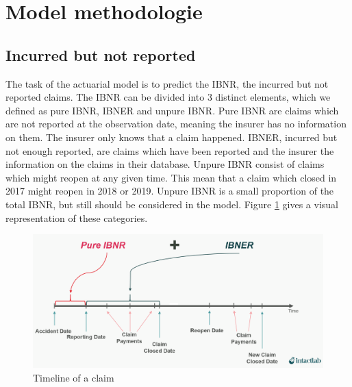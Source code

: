 \section{Model methodologie}\label{Sect_Methodologie}
\subsection{Incurred but not reported}
	The task of the actuarial model is to predict the IBNR, the incurred but not reported claims. The IBNR can be divided into 3 distinct elements, which we defined as pure IBNR, IBNER and unpure IBNR. Pure IBNR are claims which are not reported at the observation date, meaning the insurer has no information on them. The insurer only knows that a claim happened. IBNER, incurred but not enough reported, are claims which have been reported and the insurer the information on the claims in their database. Unpure IBNR consist of claims which might reopen at any given time. This mean that a claim which closed in 2017 might reopen in 2018 or 2019. Unpure IBNR is a small proportion of the total IBNR, but still should be considered in the model. Figure \ref{Fig_IBNER_timeline} gives a visual representation of these categories. 
	\begin{figure}[H]
		\begin{center}
			\includegraphics[scale=0.2]{Graphiques/IBNER_timeline} 
			\renewcommand{\figurename}{Figure}
			\caption{Timeline of a claim}\label{Fig_IBNER_timeline}
		\end{center}
	\end{figure}

